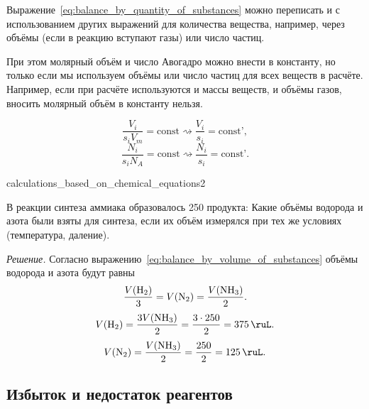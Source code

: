 Выражение~\eqref{eq:balance_by_quantity_of_substances} можно переписать и с использованием других выражений для количества вещества, например, через объёмы (если в реакцию вступают газы) или число частиц.

При этом молярный объём и число Авогадро можно внести в константу, но только если мы используем объёмы или число частиц для всех веществ в расчёте. Например, если при расчёте используются и массы веществ, и объёмы газов, вносить молярный объём в константу нельзя.

\begin{equation}
    \label{eq:balance_by_volume_of_substances}
    \frac{V_i}{s_iV_m} = \text{const} \rightsquigarrow \frac{V_i}{s_i} = \text{const'},
\end{equation}
\begin{equation}
    \frac{N_i}{s_iN_A} = \text{const} \rightsquigarrow \frac{N_i}{s_i} = \text{const'}.
\end{equation}

\begin{example}{}{calculations_based_on_chemical_equations2}
    \begin{condition}
        В реакции синтеза аммиака образовалось \qty{250}{\ruL} продукта:
        Какие объёмы водорода и азота были взяты для синтеза, если их объём измерялся при тех же условиях (температура, даление).
    \end{condition}

    \medskip

    \textit{Решение.} Согласно выражению~\eqref{eq:balance_by_volume_of_substances} объёмы водорода и азота будут равны
    \begin{equation*}
        \frac{V(\ce{H2})}{3} = V(\ce{N2}) = \frac{V(\ce{NH3})}{2}.
    \end{equation*}
    \begin{equation*}
        V(\ce{H2}) = \frac{3V(\ce{NH3})}{2} = \frac{3 \cdot 250}{2} = \qty{375}{\ruL}.
    \end{equation*}
    \begin{equation*}
        V(\ce{N2}) = \frac{V(\ce{NH3})}{2} = \frac{250}{2} = \qty{125}{\ruL}.
    \end{equation*}
\end{example}

\subsection*{Избыток и недостаток реагентов}

